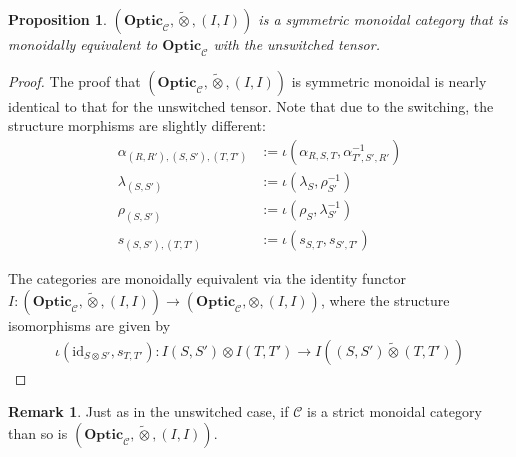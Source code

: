 \documentclass[11pt,a4paper]{article}
\theoremstyle{plain}
\newtheorem{proposition}[theorem]{Proposition}
\theoremstyle{definition}
\newtheorem{remark}[theorem]{Remark}
\newcommand{\C}{\mathscr{C}}
\newcommand{\Optic}{\mathbf{Optic}}
\newcommand{\switched}{\mathbin{\tilde{\otimes}}}
\newcommand{\id}{\mathrm{id}}
\begin{document}
\begin{proposition}
  $(\Optic_\C, \switched, (I, I))$ is a symmetric monoidal category that is monoidally equivalent to $\Optic_\C$ with the unswitched tensor.
\end{proposition}
\begin{proof}
  The proof that $(\Optic_\C, \switched, (I, I))$ is symmetric monoidal is nearly identical to that for the unswitched tensor. Note that due to the switching, the structure morphisms are slightly different:
  \begin{align*}
    \alpha_{(R, R'), (S, S'), (T, T')} &:= \iota(\alpha_{R,S,T}, \alpha_{T',S',R'}^{-1}) \\
    \lambda_{(S, S')} &:= \iota(\lambda_{S}, \rho_{S'}^{-1}) \\
    \rho_{(S, S')} &:= \iota(\rho_{S}, \lambda_{S'}^{-1}) \\
    s_{(S, S'), (T, T')} &:= \iota(s_{S, T}, s_{S', T'})
  \end{align*}

  The categories are monoidally equivalent via the identity functor $I : (\Optic_\C, \switched, (I, I)) \to (\Optic_\C, \otimes, (I, I))$, where the structure isomorphisms are given by
  \begin{align*}
    \iota(\id_{S \otimes S'}, s_{T, T'}) : I(S, S') \otimes I(T, T') \to I((S, S') \switched (T, T'))
  \end{align*}

\end{proof}

\begin{remark}
  Just as in the unswitched case, if $\C$ is a strict monoidal category than so is $(\Optic_\C, \switched, (I, I))$.
\end{remark}
\end{document}
